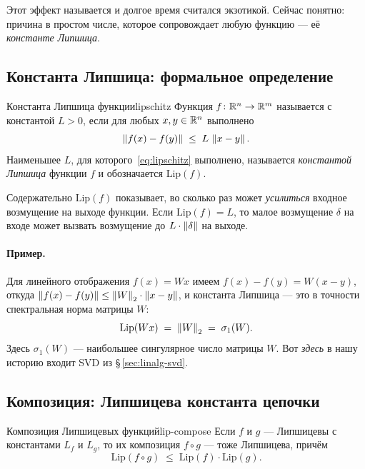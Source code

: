 Этот эффект называется  и долгое время
считался экзотикой. Сейчас понятно: причина в простом числе,
которое сопровождает любую функцию — её \emph{константе Липшица}.

\subsection{Константа Липшица: формальное определение}

\begin{definition}{Константа Липшица функции}{lipschitz}
Функция $f\colon\mathbb{R}^{n}\to\mathbb{R}^{m}$ называется  с
константой $L>0$, если для любых $x,y\in\mathbb{R}^{n}$ выполнено
\begin{equation}\label{eq:lipschitz}
\left\|f(x)-f(y)\right\|\;\leq\;L\,\left\|x-y\right\|.
\end{equation}
Наименьшее $L$, для которого~\eqref{eq:lipschitz} выполнено,
называется \emph{константой Липшица} функции $f$ и обозначается
$\mathrm{Lip}(f)$.
\end{definition}

Содержательно $\mathrm{Lip}(f)$ показывает, во сколько раз может
\emph{усилиться} входное возмущение на выходе функции. Если
$\mathrm{Lip}(f)=L$, то малое возмущение $\delta$ на входе
может вызвать возмущение до $L\cdot\left\|\delta\right\|$ на выходе.

\paragraph{Пример.} Для линейного отображения $f(x)=Wx$ имеем
$f(x)-f(y)=W(x-y)$, откуда $\left\|f(x)-f(y)\right\|\leq \left\|W\right\|_2\cdot\left\|x-y\right\|$,
и константа Липшица — это в точности спектральная норма матрицы $W$:
\begin{equation}\label{eq:lip-linear}
\mathrm{Lip}(Wx)\;=\;\left\|W\right\|_2\;=\;\sigma_1(W).
\end{equation}
Здесь $\sigma_1(W)$ — наибольшее сингулярное число матрицы $W$.
Вот \emph{здесь} в нашу историю входит SVD из §\,\ref{sec:linalg-svd}.

\subsection{Композиция: Липшицева константа цепочки}

\begin{theorem}{Композиция Липшицевых функций}{lip-compose}
Если $f$ и $g$ — Липшицевы с константами $L_f$ и $L_g$, то
их композиция $f\circ g$ — тоже Липшицева, причём
\begin{equation}\label{eq:lip-prod}
\mathrm{Lip}(f\circ g)\;\leq\;\mathrm{Lip}(f)\cdot\mathrm{Lip}(g).
\end{equation}
\end{theorem}

